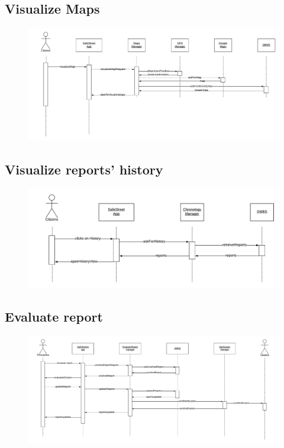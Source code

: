 \documentclass[12pt,a4paper]{report}
\begin{document}
			\subsection{Visualize Maps}					
				\begin{figure}[H]
						\includegraphics[width = \textwidth, center]{Maps}
						\caption{}
				\end{figure}
			\subsection{Visualize reports' history}					
				\begin{figure}[H]
						\includegraphics[width = \textwidth, center]{history}
						\caption{}
				\end{figure}
			\subsection{Evaluate report}					
				\begin{figure}[H]
						\includegraphics[width = \textwidth, center]{Evaluate}
						\caption{}
				\end{figure}
\end{document}
